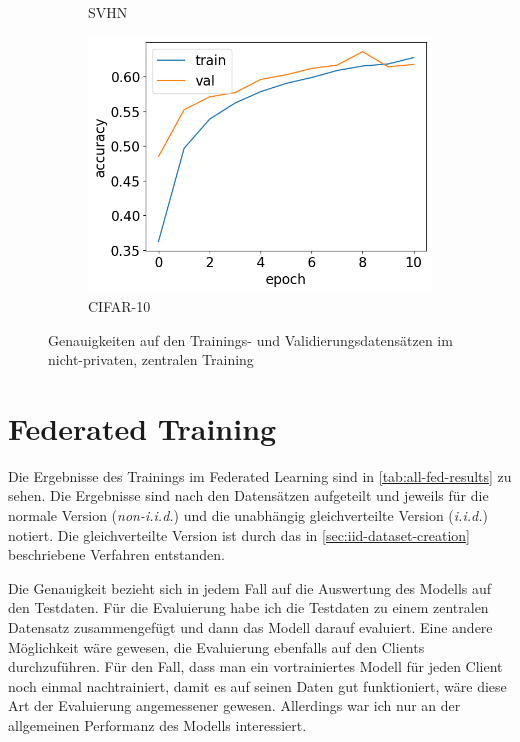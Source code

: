 \begin{figure}
\begin{subfigure}{0.32\textwidth}
		\caption{SVHN}
	\end{subfigure}
	\begin{subfigure}{0.32\textwidth}
		\centering
		\includegraphics[width=\textwidth]{Bilder/cifar-results-local.png}
		\caption{CIFAR-10}
	\end{subfigure}
	\caption{Genauigkeiten auf den Trainings- und Validierungsdatensätzen im nicht-privaten, zentralen Training}
	\label{fig:local-training-histories}
\end{figure}

\section{Federated Training}\label{sec:fl-training-results}

Die Ergebnisse des Trainings im Federated Learning sind in \autoref{tab:all-fed-results} zu sehen. Die Ergebnisse sind nach den Datensätzen aufgeteilt und jeweils für die normale Version (\textit{non-i.i.d.}) und die unabhängig gleichverteilte Version (\textit{i.i.d.}) notiert. Die gleichverteilte Version ist durch das in \autoref{sec:iid-dataset-creation} beschriebene Verfahren entstanden.

Die Genauigkeit bezieht sich in jedem Fall auf die Auswertung des Modells auf den Testdaten. Für die Evaluierung habe ich die Testdaten zu einem zentralen Datensatz zusammengefügt und dann das Modell darauf evaluiert. Eine andere Möglichkeit wäre gewesen, die Evaluierung ebenfalls auf den Clients durchzuführen. Für den Fall, dass man ein vortrainiertes Modell für jeden Client noch einmal nachtrainiert, damit es auf seinen Daten gut funktioniert, wäre diese Art der Evaluierung angemessener gewesen. Allerdings war ich nur an der allgemeinen Performanz des Modells interessiert.

